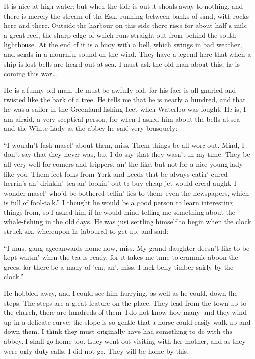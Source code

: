 \documentclass[12pt,openright]{book}
\begin{document}
It is nice at high water; but when the tide is out it shoals away to nothing, and there is merely the stream of the Esk, running between banks of sand, with rocks here and there. Outside the harbour on this side there rises for about half a mile a great reef, the sharp edge of which runs straight out from behind the south lighthouse. At the end of it is a buoy with a bell, which swings in bad weather, and sends in a mournful sound on the wind. They have a legend here that when a ship is lost bells are heard out at sea. I must ask the old man about this; he is coming this way….

He is a funny old man. He must be awfully old, for his face is all gnarled and twisted like the bark of a tree. He tells me that he is nearly a hundred, and that he was a sailor in the Greenland fishing fleet when Waterloo was fought. He is, I am afraid, a very sceptical person, for when I asked him about the bells at sea and the White Lady at the abbey he said very brusquely:–

“I wouldn’t fash masel’ about them, miss. Them things be all wore out. Mind, I don’t say that they never was, but I do say that they wasn’t in my time. They be all very well for comers and trippers, an’ the like, but not for a nice young lady like you. Them feet-folks from York and Leeds that be always eatin’ cured herrin’s an’ drinkin’ tea an’ lookin’ out to buy cheap jet would creed aught. I wonder masel’ who’d be bothered tellin’ lies to them–even the newspapers, which is full of fool-talk.” I thought he would be a good person to learn interesting things from, so I asked him if he would mind telling me something about the whale-fishing in the old days. He was just settling himself to begin when the clock struck six, whereupon he laboured to get up, and said:–

“I must gang ageeanwards home now, miss. My grand-daughter doesn’t like to be kept waitin’ when the tea is ready, for it takes me time to crammle aboon the grees, for there be a many of ’em; an’, miss, I lack belly-timber sairly by the clock.”

He hobbled away, and I could see him hurrying, as well as he could, down the steps. The steps are a great feature on the place. They lead from the town up to the church, there are hundreds of them–I do not know how many–and they wind up in a delicate curve; the slope is so gentle that a horse could easily walk up and down them. I think they must originally have had something to do with the abbey. I shall go home too. Lucy went out visiting with her mother, and as they were only duty calls, I did not go. They will be home by this.
\end{document}
